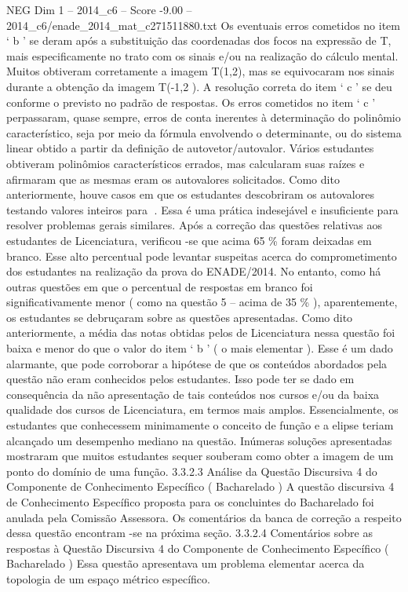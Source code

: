 \begin{textsample}{NEG Dim 1 – 2014\_c6 – Score -9.00 – 2014\_c6/enade\_2014\_mat\_c271511880.txt}
Os eventuais erros cometidos no item ‘ b ’ se deram após a substituição das coordenadas dos focos na expressão de T, mais especificamente no trato com os sinais e/ou na realização do cálculo mental.
Muitos obtiveram corretamente a imagem T(1,2), mas se equivocaram nos sinais durante a obtenção da imagem T(-1,2 ).
A resolução correta do item ‘ c ’ se deu conforme o previsto no padrão de respostas.
Os erros cometidos no item ‘ c ’ perpassaram, quase sempre, erros de conta inerentes à determinação do polinômio característico, seja por meio da fórmula envolvendo o determinante, ou do sistema linear obtido a partir da definição de autovetor/autovalor.
Vários estudantes obtiveram polinômios característicos errados, mas calcularam suas raízes e afirmaram que as mesmas eram os autovalores solicitados.
Como dito anteriormente, houve casos em que os estudantes descobriram os autovalores testando valores inteiros para .
Essa é uma prática indesejável e insuficiente para resolver problemas gerais similares.
Após a correção das questões relativas aos estudantes de Licenciatura, verificou -se que acima 65 \% foram deixadas em branco.
Esse alto percentual pode levantar suspeitas acerca do comprometimento dos estudantes na realização da prova do ENADE/2014.
No entanto, como há outras questões em que o percentual de respostas em branco foi significativamente menor ( como na questão 5 – acima de 35 \% ), aparentemente, os estudantes se debruçaram sobre as questões apresentadas.
Como dito anteriormente, a média das notas obtidas pelos de Licenciatura nessa questão foi baixa e menor do que o valor do item ‘ b ’ ( o mais elementar ).
Esse é um dado alarmante, que pode corroborar a hipótese de que os conteúdos abordados pela questão não eram conhecidos pelos estudantes.
Isso pode ter se dado em consequência da não apresentação de tais conteúdos nos cursos e/ou da baixa qualidade dos cursos de Licenciatura, em termos mais amplos.
Essencialmente, os estudantes que conhecessem minimamente o conceito de função e a elipse teriam alcançado um desempenho mediano na questão.
Inúmeras soluções apresentadas mostraram que muitos estudantes sequer souberam como obter a imagem de um ponto do domínio de uma função. 3.3.2.3 Análise da Questão Discursiva 4 do Componente de Conhecimento Específico ( Bacharelado ) A questão discursiva 4 de Conhecimento Específico proposta para os concluintes do Bacharelado foi anulada pela Comissão Assessora.
Os comentários da banca de correção a respeito dessa questão encontram -se na próxima seção. 3.3.2.4 Comentários sobre as respostas à Questão Discursiva 4 do Componente de Conhecimento Específico ( Bacharelado ) Essa questão apresentava um problema elementar acerca da topologia de um espaço métrico específico.

\end{textsample}
